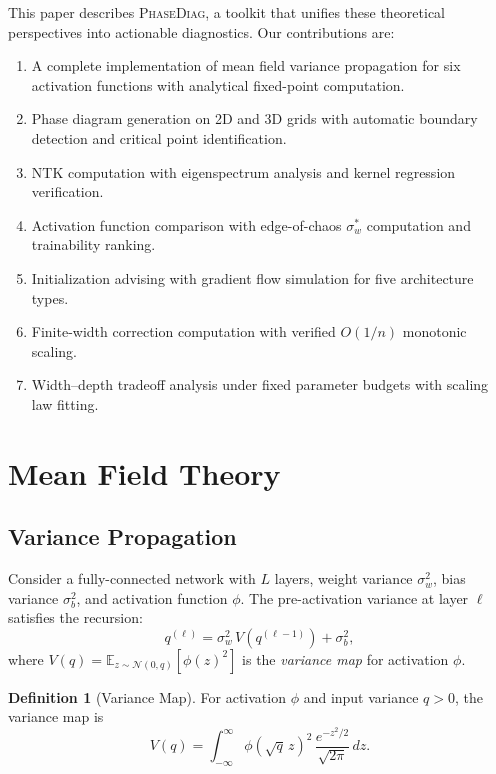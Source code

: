 \documentclass[10pt]{article}
\theoremstyle{definition}
\newtheorem{definition}[theorem]{Definition}
\begin{document}
This paper describes \textsc{PhaseDiag}, a toolkit that unifies these theoretical perspectives into actionable diagnostics.
Our contributions are:
\begin{enumerate}[nosep]
  \item A complete implementation of mean field variance propagation for six activation functions with analytical fixed-point computation.
  \item Phase diagram generation on 2D and 3D grids with automatic boundary detection and critical point identification.
  \item NTK computation with eigenspectrum analysis and kernel regression verification.
  \item Activation function comparison with edge-of-chaos $\sigma_w^*$ computation and trainability ranking.
  \item Initialization advising with gradient flow simulation for five architecture types.
  \item Finite-width correction computation with verified $O(1/n)$ monotonic scaling.
  \item Width--depth tradeoff analysis under fixed parameter budgets with scaling law fitting.
\end{enumerate}

\section{Mean Field Theory}
\label{sec:mft}

\subsection{Variance Propagation}

Consider a fully-connected network with $L$ layers, weight variance $\sigma_w^2$, bias variance $\sigma_b^2$, and activation function $\phi$.
The pre-activation variance at layer $\ell$ satisfies the recursion:
\begin{equation}
  q^{(\ell)} = \sigma_w^2 \, V\!\left(q^{(\ell-1)}\right) + \sigma_b^2,
  \label{eq:variance-recursion}
\end{equation}
where $V(q) = \mathbb{E}_{z \sim \mathcal{N}(0,q)}[\phi(z)^2]$ is the \emph{variance map} for activation $\phi$.

\begin{definition}[Variance Map]
For activation $\phi$ and input variance $q > 0$, the variance map is
\begin{equation}
  V(q) = \int_{-\infty}^{\infty} \phi(\sqrt{q}\, z)^2 \, \frac{e^{-z^2/2}}{\sqrt{2\pi}}\, dz.
\end{equation}
\end{definition}
\end{document}
